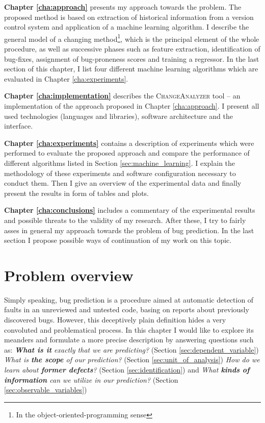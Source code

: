 \documentclass{pracamgr}
\newcommand{\bpar}[1]{\medskip\noindent\textbf{#1}}
\begin{document}
\bpar{Chapter \ref{cha:approach}} presents my approach towards the problem. The proposed method is based on extraction of historical information from a version control system and application of a machine learning algorithm. I describe the general model of a changing method\footnote{In the object-oriented-programming sense}, which is the principal element of the whole procedure, as well as successive phases such as feature extraction, identification of bug-fixes, assignment of bug-proneness scores and training a regressor. In the last section of this chapter, I list four different machine learning algorithms which are evaluated in Chapter \ref{cha:experiments}.

\bpar{Chapter \ref{cha:implementation}} describes the \textsc{ChangeAnalyzer} tool -- an implementation of the approach proposed in Chapter \ref{cha:approach}. I present all used technologies (languages and libraries), software architecture and the interface.

\bpar{Chapter \ref{cha:experiments}} contains a description of experiments which were performed to evaluate the proposed approach and compare the performance of different algorithms listed in Section \ref{sec:machine_learning}. I explain the methodology of these experiments and software configuration necessary to conduct them. Then I give an overview of the experimental data and finally present the results in form of tables and plots.

\bpar{Chapter \ref{cha:conclusions}} includes a commentary of the experimental results and possible threats to the validity of my research. After these, I try to fairly asses in general my approach towards the problem of bug prediction. In the last section I propose possible ways of continuation of my work on this topic.

\chapter{Problem overview}
\label{cha:overview}
Simply speaking, bug prediction is a procedure aimed at automatic detection of faults in an unreviewed and untested code, basing on reports about previously discovered bugs. However, this deceptively plain definition hides a very convoluted and problematical process. In this chapter I would like to explore its meanders and formulate a more precise description by answering questions such as: \emph{\textbf{What is it} exactly that we are predicting?} (Section \ref{sec:dependent_variable}) \emph{What is \textbf{the scope} of our prediction?} (Section \ref{sec:unit_of_analysis}) \emph{How do we learn about \textbf{former defects}?} (Section \ref{sec:identification}) and \emph{What \textbf{kinds of information} can we utilize in our prediction?} (Section \ref{sec:observable_variables})
\end{document}
